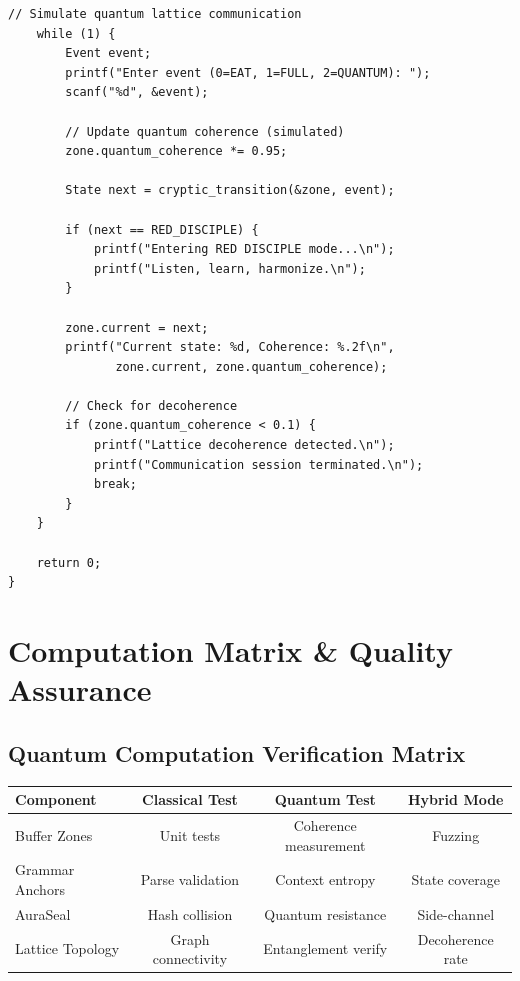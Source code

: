 \documentclass[12pt,a4paper]{article}
\begin{document}
\begin{lstlisting}[caption=Cryptic State Machine with Buffer Zones]
    // Simulate quantum lattice communication
    while (1) {
        Event event;
        printf("Enter event (0=EAT, 1=FULL, 2=QUANTUM): ");
        scanf("%d", &event);
        
        // Update quantum coherence (simulated)
        zone.quantum_coherence *= 0.95;
        
        State next = cryptic_transition(&zone, event);
        
        if (next == RED_DISCIPLE) {
            printf("Entering RED DISCIPLE mode...\n");
            printf("Listen, learn, harmonize.\n");
        }
        
        zone.current = next;
        printf("Current state: %d, Coherence: %.2f\n", 
               zone.current, zone.quantum_coherence);
        
        // Check for decoherence
        if (zone.quantum_coherence < 0.1) {
            printf("Lattice decoherence detected.\n");
            printf("Communication session terminated.\n");
            break;
        }
    }
    
    return 0;
}
\end{lstlisting}

\section{Computation Matrix \& Quality Assurance}

\subsection{Quantum Computation Verification Matrix}

\begin{center}
\begin{tabular}{|l|c|c|c|}
\hline
\textbf{Component} & \textbf{Classical Test} & \textbf{Quantum Test} & \textbf{Hybrid Mode} \\
\hline
Buffer Zones & Unit tests & Coherence measurement & Fuzzing \\
Grammar Anchors & Parse validation & Context entropy & State coverage \\
AuraSeal & Hash collision & Quantum resistance & Side-channel \\
Lattice Topology & Graph connectivity & Entanglement verify & Decoherence rate \\
\hline
\end{tabular}
\end{center}
\end{document}
